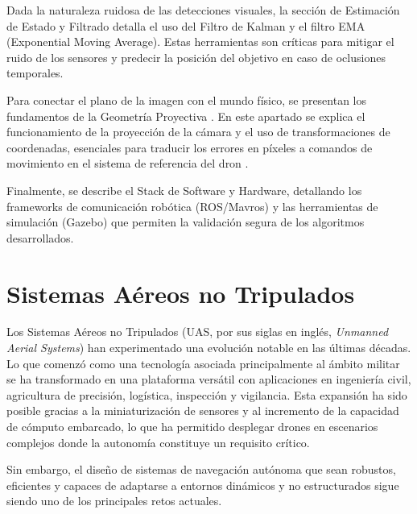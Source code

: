 \vspace{0.4cm}

Dada la naturaleza ruidosa de las detecciones visuales, la sección de Estimación de Estado y Filtrado detalla el uso del Filtro de Kalman \cite{kalman1960new} y el filtro EMA (Exponential Moving Average). Estas herramientas son críticas para mitigar el ruido de los sensores y predecir la posición del objetivo en caso de oclusiones temporales.

\vspace{0.4cm}
  
Para conectar el plano de la imagen con el mundo físico, se presentan los fundamentos de la Geometría Proyectiva \cite{CameraModels}. En este apartado se explica el funcionamiento de la proyección de la cámara y el uso de transformaciones de coordenadas, esenciales para traducir los errores en píxeles a comandos de movimiento en el sistema de referencia del dron \cite{asl2014adaptive}.

\vspace{0.4cm}

Finalmente, se describe el Stack de Software y Hardware, detallando los frameworks de comunicación robótica (ROS/Mavros) y las herramientas de simulación (Gazebo) que permiten la validación segura de los algoritmos desarrollados.

\section{Sistemas Aéreos no Tripulados}

Los Sistemas Aéreos no Tripulados (UAS, por sus siglas en inglés, \textit{Unmanned Aerial Systems}) han experimentado una evolución notable en las últimas décadas. Lo que comenzó como una tecnología asociada principalmente al ámbito militar se ha transformado en una plataforma versátil con aplicaciones en ingeniería civil, agricultura de precisión, logística, inspección y vigilancia. Esta expansión ha sido posible gracias a la miniaturización de sensores y al incremento de la capacidad de cómputo embarcado, lo que ha permitido desplegar drones en escenarios complejos donde la autonomía constituye un requisito crítico.

\vspace{0.4cm}

Sin embargo, el diseño de sistemas de navegación autónoma que sean robustos, eficientes y capaces de adaptarse a entornos dinámicos y no estructurados sigue siendo uno de los principales retos actuales.
\vspace{0.4cm}

